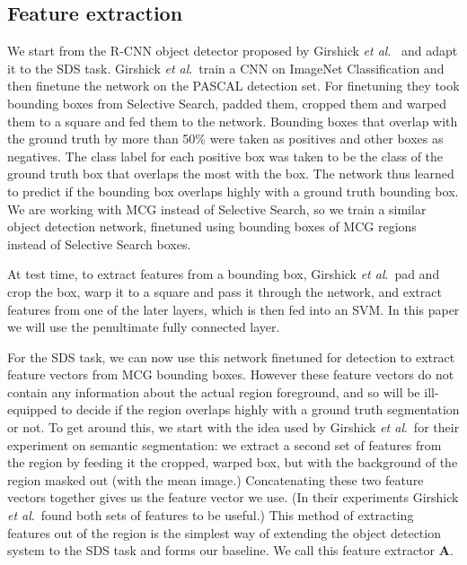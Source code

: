 \documentclass[runningheads]{llncs}
\newcommand\etal{\emph{et al}.\ }
\newcommand\methodA{\textbf{A}}
\begin{document}
\subsection{Feature extraction}
\label{sec:feat}
We start from the R-CNN object detector proposed by Girshick \etal\cite{GirshickCVPR14} and adapt it to the SDS task. Girshick \etal  train a CNN on ImageNet Classification and then finetune the network on the PASCAL detection set. For finetuning they took bounding boxes from Selective Search, padded them, cropped them and warped them to a square and fed them to the network. Bounding boxes that overlap with the ground truth by more than 50\% were taken as positives and other boxes as negatives. The class label for each positive box was taken to be the class of the ground truth box that overlaps the most with the box. The network thus learned to predict if the bounding box overlaps highly with a ground truth bounding box. We are working with MCG instead of Selective Search, so we train a similar object detection network, finetuned using bounding boxes of MCG regions instead of Selective Search boxes. 

At test time, to extract features from a bounding box, Girshick \etal pad and crop the box, warp it to a square and pass it through the network, and extract features from one of the later layers, which is then fed into an SVM. In this paper we will use the penultimate fully connected layer.

For the SDS task, we can now use this network finetuned for detection to extract feature vectors from MCG bounding boxes. However these feature vectors do not contain any information about the actual region foreground, and so will be ill-equipped to decide if the region overlaps highly with a ground truth segmentation or not. To get around this, we start with the idea used by Girshick \etal for their experiment on semantic segmentation: we extract a second set of features from the region by feeding it the cropped, warped box, but with the background of the region masked out (with the mean image.) Concatenating these two feature vectors together gives us the feature vector we use. (In their experiments Girshick \etal found both sets of features to be useful.) This method of extracting features out of the region is the simplest way of extending the object detection system to the SDS task and forms our baseline. We call this feature extractor \textbf{\methodA{}}.
\end{document}
